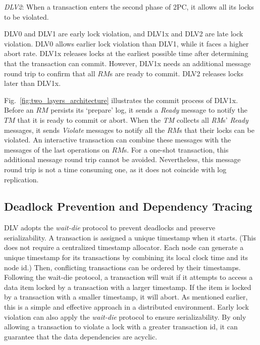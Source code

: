 \documentclass[conference]{IEEEtran}
\begin{document}
\emph{DLV2}: When a transaction enters the second phase of 2PC, it allows all its locks to be violated.

DLV0 and DLV1 are early lock violation, and DLV1x and DLV2 are late lock violation.
DLV0 allows earlier lock violation than DLV1, while it faces a higher abort rate.
DLV1x releases locks at the earliest possible time after determining that the transaction can commit. 
However, DLV1x needs an additional message round trip to confirm that all $RM$s are ready to commit.
DLV2 releases locks later than DLV1x.

Fig.~\ref{fig:two_layers_architecture} illustrates the commit process of DLV1x.
Before an ${RM}$ persists its `prepare' log, it sends a \emph{Ready} message to notify the ${TM}$ that it is ready to commit or abort.
When the \emph{TM} collects all \emph{RM}s' \emph{Ready} messages, it sends \emph{Violate} messages to notify all the $RM$s that their locks can be violated.
An interactive transaction can combine these messages with the messages of the last operations on $RM$s.
For a one-shot transaction, this additional message round trip cannot be avoided.
Nevertheless, this message round trip is not a time consuming one, as it does not coincide with log replication.

\subsection {Deadlock Prevention and Dependency Tracing}

DLV adopts the \emph{wait-die} protocol to prevent deadlocks and preserve serializability.
A transaction is assigned a unique timestamp when it starts.
(This does not require a centralized timestamp allocator.
Each node can generate a unique timestamp for its transactions by combining its local clock time and its node id.)
Then, conflicting transactions can be ordered by their timestamps.
Following the wait-die protocol, a transaction will wait if it attempts to access a data item locked by a transaction with a larger timestamp.
If the item is locked by a transaction with a smaller timestamp, it will abort.
As mentioned earlier, this is a simple and effective approach in a distributed environment.
Early lock violation can also apply the \emph{wait-die} protocol to ensure serializability.
By only allowing a transaction to violate a lock with a greater transaction id, 
it can guarantee that the data dependencies are acyclic.
\end{document}

